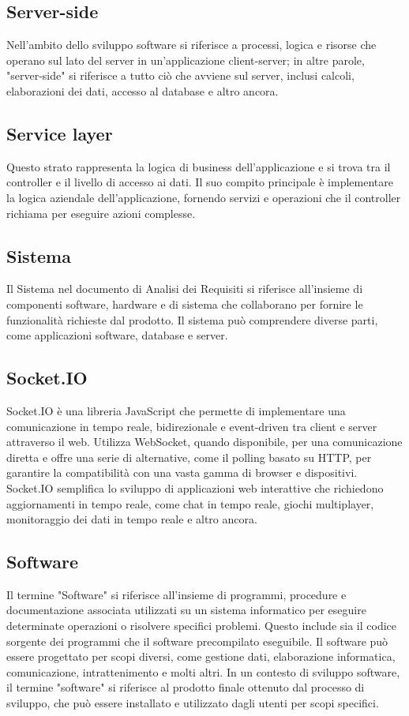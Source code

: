 \subsection*{Server-side} 
Nell'ambito dello sviluppo software si riferisce a processi, logica e risorse che operano sul lato del server in un'applicazione client-server; in altre parole, "server-side" si riferisce a tutto ciò che avviene sul server, inclusi calcoli, elaborazioni dei dati, accesso al database e altro ancora.
\subsection*{Service layer} 
Questo strato rappresenta la logica di business dell'applicazione e si trova tra il controller e il livello di accesso ai dati. Il suo compito principale è implementare la logica aziendale dell'applicazione, fornendo servizi e operazioni che il controller richiama per eseguire azioni complesse.
\subsection*{Sistema} 
Il Sistema nel documento di Analisi dei Requisiti si riferisce all'insieme di componenti software, hardware e di sistema che collaborano per fornire le funzionalità richieste dal prodotto. Il sistema può comprendere diverse parti, come applicazioni software, database e server.
\subsection*{Socket.IO} 
Socket.IO è una libreria JavaScript che permette di implementare una comunicazione in tempo reale, bidirezionale e event-driven tra client e server attraverso il web. Utilizza WebSocket, quando disponibile, per una comunicazione diretta e offre una serie di alternative, come il polling basato su HTTP, per garantire la compatibilità con una vasta gamma di browser e dispositivi. Socket.IO semplifica lo sviluppo di applicazioni web interattive che richiedono aggiornamenti in tempo reale, come chat in tempo reale, giochi multiplayer, monitoraggio dei dati in tempo reale e altro ancora.
\subsection*{Software} 
Il termine "Software" si riferisce all'insieme di programmi, procedure e documentazione associata utilizzati su un sistema informatico per eseguire determinate operazioni o risolvere specifici problemi. Questo include sia il codice sorgente dei programmi che il software precompilato eseguibile. Il software può essere progettato per scopi diversi, come gestione dati, elaborazione informatica, comunicazione, intrattenimento e molti altri. In un contesto di sviluppo software, il termine "software" si riferisce al prodotto finale ottenuto dal processo di sviluppo, che può essere installato e utilizzato dagli utenti per scopi specifici. 
